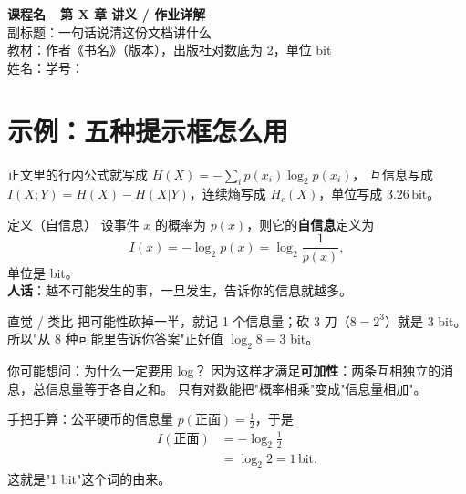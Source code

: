 \documentclass[11pt,a4paper,fontset=fandol]{ctexart}
\newcommand{\Hx}[1]{H\!\left(#1\right)}       %
\newcommand{\Hc}[1]{H_{c}\!\left(#1\right)}   %
\newcommand{\I}[1]{I\!\left(#1\right)}        %
\newcommand{\lb}{\log_{2}}                    %
\newcommand{\bit}{\,\text{bit}}               %
\begin{document}
\begin{center}
  {\LARGE\bfseries 课程名\ \ 第 X 章 讲义 / 作业详解}\\[6pt]
  {\large 副标题：一句话说清这份文档讲什么}\\[8pt]
  {\small 教材：作者《书名》（版本），出版社\quad 对数底为 2，单位 bit}\\[4pt]
  {\small 姓名：\underline{\hspace{3cm}}\quad 学号：\underline{\hspace{3cm}}}
\end{center}

\tableofcontents   %
\newpage

\section{示例：五种提示框怎么用}

正文里的行内公式就写成 $\Hx{X}=-\sum_i p(x_i)\lb p(x_i)$，
互信息写成 $\I{X;Y}=\Hx{X}-\Hx{X|Y}$，连续熵写成 $\Hc{X}$，单位写成 $3.26\bit$。

\begin{defbox}{定义（自信息）}
设事件 $x$ 的概率为 $p(x)$，则它的\textbf{自信息}定义为
\[
I(x)=-\lb p(x)=\lb\frac{1}{p(x)} ,
\]
单位是 bit。\\
\textbf{人话}：越不可能发生的事，一旦发生，告诉你的信息就越多。
\end{defbox}

\begin{idea}{直觉 / 类比}
把可能性砍掉一半，就记 1 个信息量；砍 3 刀（$8=2^3$）就是 3 bit。
所以"从 8 种可能里告诉你答案"正好值 $\lb 8=3$ bit。
\end{idea}

\begin{qa}{你可能想问：为什么一定要用 log？}
因为这样才满足\textbf{可加性}：两条互相独立的消息，总信息量等于各自之和。
只有对数能把"概率相乘"变成"信息量相加"。
\end{qa}

\begin{calc}{手把手算：公平硬币的信息量}
$p(\text{正面})=\tfrac12$，于是
\begin{align*}
I(\text{正面})&=-\lb\frac12\\
&=\lb 2=1\bit .
\end{align*}
这就是"1 bit"这个词的由来。
\end{calc}
\end{document}
